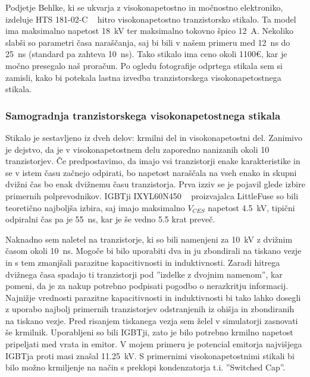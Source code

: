\documentclass[a4paper,twoside,openright,12pt,Slovene]{book}
\begin{document}
	Podjetje Behlke, ki se ukvarja z visokonapetostno in močnostno elektroniko, izdeluje HTS 181-02-C ~\cite{Behlke:HTS181-02-C} hitro visokonapetostno tranzistorsko stikalo. Ta model ima maksimalno napetost \SI{18}{\kilo\volt} ter maksimalno tokovno špico \SI{12}{\ampere}. Nekoliko slabši so parametri časa naraščanja, saj bi bili v našem primeru med \SI{12}{\nano\second} do \SI{25}{\nano\second} (standard pa zahteva \SI{10}{\nano\second}). Tako stikalo ima ceno okoli 1100\euro , kar je močno presegalo naš proračun. Po ogledu fotografije odprtega stikala sem si zamisli, kako bi potekala lastna izvedba tranzistorskega visokonapetostnega stikala.
	
	\subsubsection{Samogradnja tranzistorskega visokonapetostnega stikala} \label{Samogradnja tranzistorskega visokonapetostnega stikala}
	
	Stikalo je sestavljeno iz dveh delov: krmilni del in visokonapetostni del. Zanimivo je dejstvo, da je v visokonapetostnem delu zaporedno nanizanih okoli 10 tranzistorjev. Če predpostavimo, da imajo vsi tranzistorji enake karakteristike in se v istem času začnejo odpirati, bo napetost naraščala na vseh enako in skupni dvižni čas bo enak dvižnemu času tranzistorja. Prva izziv se je pojavil glede izbire primernih polprevodnikov. IGBTji IXYL60N450 ~\cite{IXYS:IXYL60N450} proizvajalca LittleFuse so bili teoretično najboljša izbira, saj imajo maksimalno \(V_{CES}\) napetost \SI{4.5}{\kilo\volt}, tipični odpiralni čas pa je \SI{55}{\nano\second}, kar je še vedno 5.5 krat preveč. 

    Naknadno sem naletel na tranzistorje, ki so bili namenjeni za \SI{10}{\kilo\volt} z dvižnim časom okoli \SI{10}{\nano\second}. Mogoče bi bilo uporabiti dva in ju zbondirali na tiskano vezje in s tem zmanjšali parazitne kapacitivnosti in induktivnosti. Zaradi hitrega dvižnega časa spadajo ti tranzistorji pod ''izdelke z dvojnim namenom'', kar pomeni, da je za nakup potrebno podpisati pogodbo o nerazkritju informacij. Najnižje vrednosti parazitne kapacitivnosti in induktivnosti bi tako lahko dosegli z uporabo najbolj primernih tranzistorjev odstranjenih iz ohišja in zbondiranih na tiskano vezje. Pred risanjem tiskanega vezja sem želel v simulatorji zasnovati še krmilnik. Uporabljeni so bili IGBTji, zato je bilo potrebno krmilno napetost pripeljati med vrata in emitor. V mojem primeru je potencial emitorja najvišjega IGBTja proti masi znašal \SI{11.25}{\kilo\volt}. S primernimi visokonapetostnimi stikali bi bilo možno krmiljenje na način s preklopi kondenzatorja t.i. ''Switched Cap''.
\end{document}
